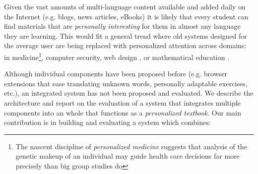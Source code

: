 

Given the vast amounts of multi-language content available and added daily on the Internet (e.g. blogs, news articles, eBooks) it is likely that every student can find materials that are {\em personally interesting} for them in almost any language they are learning. 
This would fit a general trend where old systems designed for the average user are being replaced with personalized attention across domains: in medicine\footnote{The nascent discipline of {\em personalized medicine} suggests that analysis of the genetic makeup of an individual may guide health care decisions far more precisely than big group studies do}, computer security,  web design \cite{Reinecke13-CulturalAdaptation}, or mathematical education \cite{Polozov15-AdaptableMath}. 
% 
% 
% 
% 
% 
% 
% 


Although individual components have been proposed before (e.g. browser extensions that ease translating unknown words, personally adaptable exercises, etc.), an integrated system has not been proposed and evaluated. We describe the architecture and report on the evaluation of a system that integrates multiple components into an whole that functions as a {\em personalized textbook}. Our main contribution is in building and evaluating a system which combines: 

